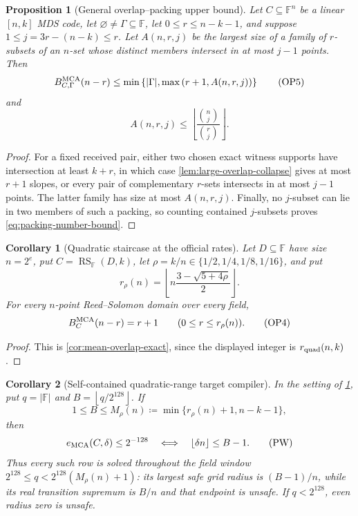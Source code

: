 \documentclass[11pt,a4paper]{amsart}
\numberwithin{equation}{section}
\newtheorem{proposition}[proposition]{Proposition}
\newtheorem{corollary}[corollary]{Corollary}
\theoremstyle{remark}
\DeclareMathOperator{\RS}{RS}
\newcommand{\F}{\mathbb F}
\newcommand{\abs}[1]{\lvert #1\rvert}
\newcommand{\floor}[1]{\left\lfloor #1\right\rfloor}
\newcommand{\defeq}{\coloneqq}
\begin{document}
\begin{proposition}[General overlap--packing upper bound]
\label{prop:general-overlap-packing-upper}
Let \(C\subseteq\F^n\) be a linear \([n,k]\) MDS code, let
\(\varnothing\ne\Gamma\subseteq\F\), let \(0\le r\le n-k-1\), and
suppose \(1\le j=3r-(n-k)\le r\).  Let \(A(n,r,j)\) be the largest size of a
family of \(r\)-subsets of an \(n\)-set whose distinct members intersect
in at most \(j-1\) points.  Then
\[
 B_{C,\Gamma}^{\rm MCA}(n-r)
 \le\min\left\{\abs\Gamma,
     \max\left(r+1,A(n,r,j)\right)\right\}          \tag{OP5}
\label{eq:general-overlap-packing-upper}
\]
and
\[
 A(n,r,j)\le
 \floor{\frac{\binom nj}{\binom rj}}.              \tag{OP6}
\label{eq:packing-number-bound}
\]
\end{proposition}

\begin{proof}
For a fixed received pair, either two chosen exact witness supports have
intersection at least \(k+r\), in which case
\cref{lem:large-overlap-collapse} gives at most \(r+1\) slopes, or every
pair of complementary \(r\)-sets intersects in at most \(j-1\) points.
The latter family has size at most \(A(n,r,j)\).  Finally, no \(j\)-subset
can lie in two members of such a packing, so counting contained
\(j\)-subsets proves \eqref{eq:packing-number-bound}.
\end{proof}

\begin{corollary}[Quadratic staircase at the official rates]
\label{thm:prize-rate-overlap}
Let \(D\subseteq\F\) have size \(n=2^e\), put
\(C=\RS_\F(D,k)\), let
\(\rho=k/n\in\{1/2,1/4,1/8,1/16\}\), and put
\[
 r_\rho(n)=\floor{
 n\frac{3-\sqrt{5+4\rho}}2}.
\]
For every \(n\)-point Reed--Solomon domain over every field,
\[
 B_C^{\rm MCA}(n-r)=r+1
 \qquad(0\le r\le r_\rho(n)).                     \tag{OP4}
\label{eq:prize-rate-staircase}
\]
\end{corollary}

\begin{proof}
This is \cref{cor:mean-overlap-exact}, since the displayed integer is
\(r_{\rm quad}(n,k)\).
\end{proof}

\begin{corollary}[Self-contained quadratic-range target compiler]
\label{cor:prize-window-compiler}
In the setting of \cref{thm:prize-rate-overlap}, put
\(q=\abs\F\) and \(B=\floor{q/2^{128}}\).  If
\[
 1\le B\le M_\rho(n)
 \defeq\min\{r_\rho(n)+1,n-k-1\},
\]
then
\[
 e_{\rm MCA}(C,\delta)\le2^{-128}
 \quad\Longleftrightarrow\quad
 \floor{\delta n}\le B-1.                        \tag{PW}
\label{eq:prize-window-iff}
\]
Thus every such row is solved throughout the field window
\(2^{128}\le q<2^{128}(M_\rho(n)+1)\): its largest safe grid radius is
\((B-1)/n\), while its real transition supremum is \(B/n\) and that
endpoint is unsafe.  If \(q<2^{128}\), even radius zero is unsafe.
\end{corollary}
\end{document}
